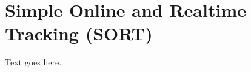 \section{Simple Online and Realtime Tracking (SORT)}
\label{sec:background/section_b}

Text goes here.
